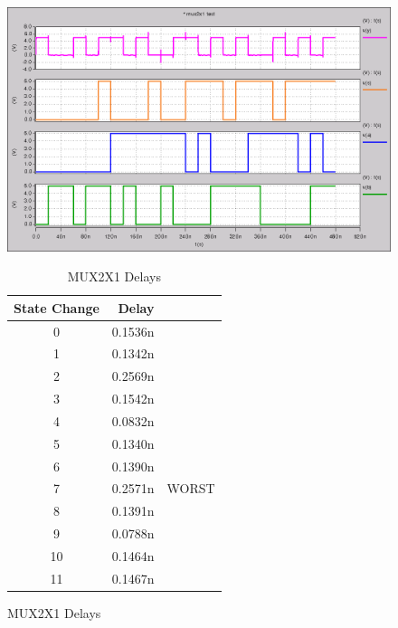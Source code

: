         \begin{figure}[H]
            \centering
            \begin{minipage}[t]{.50\textwidth}
                \vspace{0pt}
                \centering
                \includegraphics[width=\linewidth]{../../spice/mux2x1.png}
                \caption{MUX2X1 Spice Results}
            \end{minipage}
            \hfill
            \begin{minipage}[t]{.45\textwidth}
                \vspace{0pt}
                \begin{table}[H]
                    \centering
                    \begin{tabular}{crc}
                        \toprule
                        \textbf{State Change} & \textbf{Delay} & \\
                        \midrule
                        0  & 0.1536n & \\
                        1  & 0.1342n & \\
                        2  & 0.2569n & \\
                        3  & 0.1542n & \\
                        4  & 0.0832n & \\
                        5  & 0.1340n & \\
                        6  & 0.1390n & \\
                        7  & 0.2571n & WORST \\
                        8  & 0.1391n & \\
                        9  & 0.0788n & \\
                        10 & 0.1464n & \\
                        11 & 0.1467n & \\
                        \bottomrule
                    \end{tabular}
                    \caption{MUX2X1 Delays}
                \end{table}
            \end{minipage}
        \end{figure}



